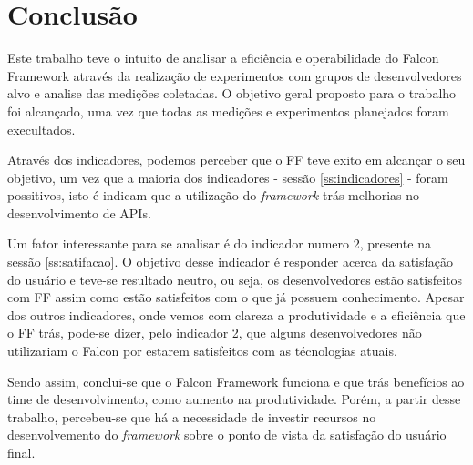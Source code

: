 \chapter[Conclusão]{Conclusão}

Este trabalho teve o intuito de analisar a eficiência e operabilidade do Falcon Framework através
da realização de experimentos com grupos de desenvolvedores alvo e analise das medições
coletadas. O objetivo geral proposto para o trabalho foi alcançado, uma vez que todas
as medições e experimentos planejados foram execultados.

Através dos indicadores, podemos perceber que o FF teve exito em alcançar o seu objetivo, um vez que
a maioria dos indicadores - sessão \ref{ss:indicadores} - foram possitivos, isto é indicam que a utilização
do \textit{framework} trás melhorias no desenvolvimento de APIs.

Um fator interessante para se analisar é do indicador numero 2, presente na sessão \ref{ss:satifacao}.
O objetivo desse indicador é responder acerca da satisfação do usuário e teve-se resultado neutro, ou seja,
os desenvolvedores estão satisfeitos com FF assim como estão satisfeitos com o que já possuem conhecimento.
Apesar dos outros indicadores, onde vemos com clareza a produtividade e a eficiência que o FF trás, pode-se
dizer, pelo indicador 2, que alguns desenvolvedores não utilizariam o Falcon por estarem satisfeitos com
as técnologias atuais.

Sendo assim, conclui-se que o Falcon Framework funciona e que trás benefícios ao time de desenvolvimento, como
aumento na produtividade. Porém, a partir desse trabalho, percebeu-se que há a necessidade de investir
recursos no desenvolvemento do \textit{framework} sobre o ponto de vista da satisfação do usuário final.
